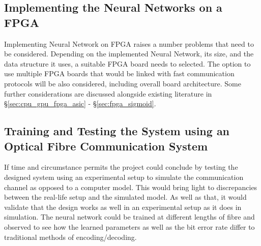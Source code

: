 \subsection{Implementing the Neural Networks on a FPGA}

Implementing Neural Network on FPGA raises a number problems that need to be considered. Depending on the implemented Neural Network, its size, and the data structure it uses, a suitable FPGA board needs to selected. The option to use multiple FPGA boards that would be linked with fast communication protocols will be also considered, including overall board architecture. Some further considerations are discussed alongside existing literature in \S \ref{sec:cpu_gpu_fpga_asic} - \S \ref{sec:fpga_sigmoid}.



\subsection{Training and Testing the System using an Optical Fibre Communication System}

If time and circumstance permits the project could conclude by testing the designed system using an experimental setup to simulate the communication channel as opposed to a computer model. This would bring light to discrepancies between the real-life setup and the simulated model. As well as that, it would validate that the design works as well in an experimental setup as it does in simulation. The neural network could be trained at different lengths of fibre and observed to see how the learned parameters as well as the bit error rate differ to traditional methods of encoding/decoding. 
